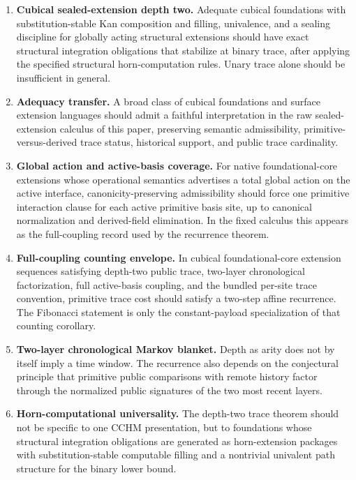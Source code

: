 \documentclass{lmcs}
\begin{document}
\begin{enumerate}
\item \textbf{Cubical sealed-extension depth two.} Adequate cubical foundations with substitution-stable Kan composition and filling, univalence, and a sealing discipline for globally acting structural extensions should have exact structural integration obligations that stabilize at binary trace, after applying the specified structural horn-computation rules. Unary trace alone should be insufficient in general.
\item \textbf{Adequacy transfer.} A broad class of cubical foundations and surface extension languages should admit a faithful interpretation in the raw sealed-extension calculus of this paper, preserving semantic admissibility, primitive-versus-derived trace status, historical support, and public trace cardinality.
\item \textbf{Global action and active-basis coverage.} For native foundational-core extensions whose operational semantics advertises a total global action on the active interface, canonicity-preserving admissibility should force one primitive interaction clause for each active primitive basis site, up to canonical normalization and derived-field elimination. In the fixed calculus this appears as the full-coupling record used by the recurrence theorem.
\item \textbf{Full-coupling counting envelope.} In cubical foundational-core extension sequences satisfying depth-two public trace, two-layer chronological factorization, full active-basis coupling, and the bundled per-site trace convention, primitive trace cost should satisfy a two-step affine recurrence. The Fibonacci statement is only the constant-payload specialization of that counting corollary.
\item \textbf{Two-layer chronological Markov blanket.} Depth as arity does not by itself imply a time window. The recurrence also depends on the conjectural principle that primitive public comparisons with remote history factor through the normalized public signatures of the two most recent layers.
\item \textbf{Horn-computational universality.} The depth-two trace theorem should not be specific to one CCHM presentation, but to foundations whose structural integration obligations are generated as horn-extension packages with substitution-stable computable filling and a nontrivial univalent path structure for the binary lower bound.
\end{enumerate}
\end{document}
